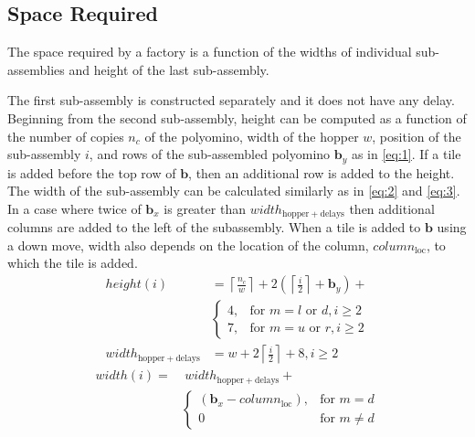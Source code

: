 \subsection{Space Required}\label{sec:requiredSpace}
The space required by a factory is a function of the widths of individual sub-assemblies and height of the last sub-assembly.


The first sub-assembly is constructed separately and it does not have any delay.
Beginning from the second sub-assembly, height can be computed as a function of the number of copies $n_c$ of the polyomino, width of the hopper $w$, position of the sub-assembly $i$, and rows of the sub-assembled polyomino $\mathbf{b}_y$ as in \eqref{eq:1}. If a tile is added before the top row of $\mathbf{b}$, then an additional row is added to the height.
The width of the sub-assembly can be calculated similarly as in \eqref{eq:2} and \eqref{eq:3}. 
In a case where twice of $\mathbf{b}_x$ is greater than $width_{\mathrm{hopper}+\mathrm{delays}}$ then additional columns are added to the left of the subassembly. 
When a tile is added to $\mathbf{b}$ using a down move, width also depends on the location of the column, $column_{\mathrm{loc}}$, to which the tile is added.  
\begin{align}
height(i) &= \left \lceil{ \frac{n_c}{w}}\right \rceil+2\left(\left \lceil{\frac{i}{2}}\right \rceil+\mathbf{b}_y\right)+ \nonumber \\
&\begin{cases}
  4,&\text{for } m = l \text{ or } d, i \geq 2\\
7,&\text{for } m = u \text{ or } r, i \geq 2 
\end{cases}\label{eq:1} \\
width_{\mathrm{hopper}+\mathrm{delays}}&=w+2\left \lceil{ \frac{i}{2}}\right \rceil+8,  i \geq 2 \label{eq:2} \end{align}
\begin{align}
width(i)=&~width_{\mathrm{hopper}+\mathrm{delays}} +\nonumber\\
&\begin{cases}
(\mathbf{b}_x-column_{\mathrm{loc}}),&\text{for } m = d \\
0 &\text{for } m \neq d  \label{eq:3}
\end{cases}
\end{align}
  

